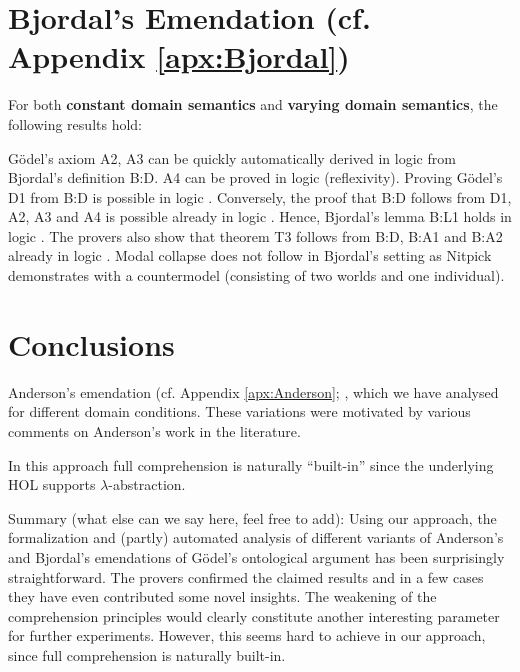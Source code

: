 \documentclass{birkjour}
\theoremstyle{definition}
\theoremstyle{remark}
\numberwithin{equation}{section}
\begin{document}

 
\section{Bjordal's Emendation (cf. Appendix \ref{apx:Bjordal})}

For both \textbf{constant domain semantics} and \textbf{varying domain semantics}, the following results hold:

    G\"odel's axiom
  A2, A3 can be quickly automatically derived in logic \K from
  Bjordal's definition B:D. A4 can be proved in logic \KT
  (reflexivity). Proving G\"odel's D1 from B:D is possible in logic
  \KFour. Conversely, the proof that B:D follows from D1, A2, A3 and
  A4 is possible already in logic \K. Hence, Bjordal's lemma
  B:L1 holds in logic \SFour. The provers also show that theorem T3
  follows from B:D, B:A1 and B:A2 already in logic \KB. Modal collapse
  does not follow in Bjordal's setting as Nitpick demonstrates with a
  countermodel (consisting of two worlds and one individual). 




\section{Conclusions}

Anderson's emendation (cf. Appendix \ref{apx:Anderson}; ,
which we have analysed for different domain conditions. These
variations were motivated by various comments on Anderson's work in
the literature. 

In this approach full comprehension is
naturally ``built-in'' since the underlying HOL supports
$\lambda$-abstraction.

Summary (what else can we say here, feel free to add): Using our approach, the formalization and (partly) automated
analysis of different variants of Anderson's and Bjordal's emendations
of G\"odel's ontological argument has been surprisingly
straightforward. The provers confirmed the claimed results and in a
few cases they have even contributed some novel insights. The
weakening of the comprehension principles would clearly constitute
another interesting parameter for further experiments. However, this
seems hard to achieve in our approach, since full comprehension is
naturally built-in.
\end{document}
